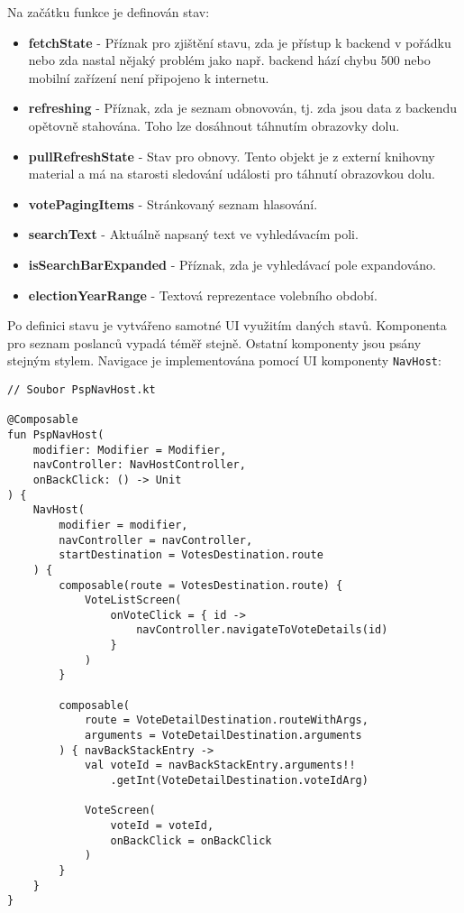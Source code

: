 \noindent Na začátku funkce je definován stav:

\begin{itemize}
	\item \textbf{fetchState} - Příznak pro zjištění stavu, zda je přístup k backend v pořádku nebo zda nastal nějaký problém jako např. backend hází chybu 500 nebo mobilní zařízení není připojeno k internetu.
	
	\item \textbf{refreshing} - Příznak, zda je seznam obnovován, tj. zda jsou data z backendu opětovně stahována. Toho lze dosáhnout táhnutím obrazovky dolu.
	
	\item \textbf{pullRefreshState} - Stav pro obnovy. Tento objekt je z externí knihovny material a má na starosti sledování události pro táhnutí obrazovkou dolu.
	
	\item \textbf{votePagingItems} - Stránkovaný seznam hlasování.
	
	\item \textbf{searchText} - Aktuálně napsaný text ve vyhledávacím poli.
	
	\item \textbf{isSearchBarExpanded} - Příznak, zda je vyhledávací pole expandováno.
	
	\item \textbf{electionYearRange} - Textová reprezentace volebního období.
\end{itemize}

\noindent Po definici stavu je vytvářeno samotné UI využitím daných stavů. Komponenta pro seznam poslanců vypadá téměř stejně. Ostatní komponenty jsou psány stejným stylem. Navigace je implementována pomocí UI komponenty \lstinline|NavHost|:

\begin{lstlisting}[caption={Komponenta pro navigaci}, tabsize=2]
// Soubor PspNavHost.kt

@Composable
fun PspNavHost(
	modifier: Modifier = Modifier,
	navController: NavHostController,
	onBackClick: () -> Unit
) {
	NavHost(
		modifier = modifier,
		navController = navController,
		startDestination = VotesDestination.route
	) {
		composable(route = VotesDestination.route) {
			VoteListScreen(
				onVoteClick = { id ->
					navController.navigateToVoteDetails(id)
				}
			)
		}
	
		composable(
			route = VoteDetailDestination.routeWithArgs,
			arguments = VoteDetailDestination.arguments
		) { navBackStackEntry ->
			val voteId = navBackStackEntry.arguments!!
				.getInt(VoteDetailDestination.voteIdArg)
			
			VoteScreen(
				voteId = voteId,
				onBackClick = onBackClick
			)
		}
	}
}
\end{lstlisting}

